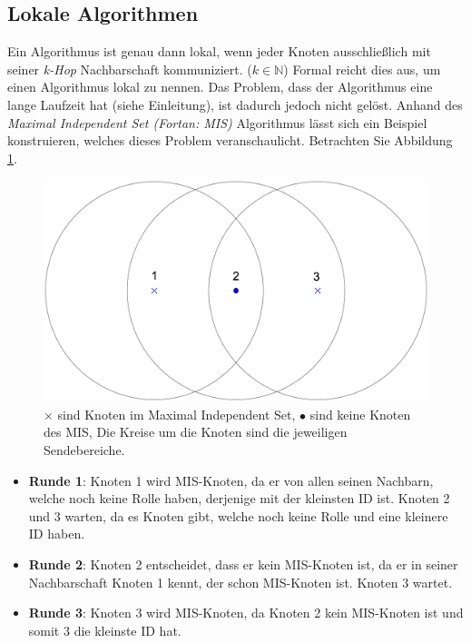 \documentclass[a4paper,twoside]{IEEEtran}
\begin{document}
\subsection{Lokale Algorithmen} \label{lokal}
Ein Algorithmus ist genau dann lokal, wenn jeder Knoten ausschließlich mit seiner \emph{k-Hop} Nachbarschaft kommuniziert. ($k \in \mathds{N}$)
Formal reicht dies aus, um einen Algorithmus lokal zu nennen.
Das Problem, dass der Algorithmus eine lange Laufzeit hat (siehe Einleitung), ist dadurch jedoch nicht gelöst.
Anhand des \emph{Maximal Independent Set (Fortan: MIS)} Algorithmus lässt sich ein Beispiel konstruieren, welches dieses Problem veranschaulicht.
Betrachten Sie Abbildung \ref{fig:MIS}.

\begin{figure}[h!]
\centering
\includegraphics[width=0.99\linewidth]{MIS.eps}
\caption{$\times $ sind Knoten im Maximal Independent Set, $\bullet $ sind keine Knoten des MIS, Die Kreise um die Knoten sind die jeweiligen Sendebereiche.}
\label{fig:MIS}
\end{figure}


\begin{itemize}
\item \textbf{Runde 1}: Knoten 1 wird MIS-Knoten, da er von allen seinen Nachbarn, welche noch keine Rolle haben, derjenige mit der kleinsten ID ist. Knoten 2 und 3 warten, da es Knoten gibt, welche noch keine Rolle und eine kleinere ID haben.

\item \textbf{Runde 2}: Knoten 2 entscheidet, dass er kein MIS-Knoten ist, da er in seiner Nachbarschaft Knoten 1 kennt, der schon MIS-Knoten ist. Knoten 3 wartet.

\item \textbf{Runde 3}: Knoten 3 wird MIS-Knoten, da Knoten 2 kein MIS-Knoten ist und somit 3 die kleinste ID hat. 
\end{itemize}
\end{document}

